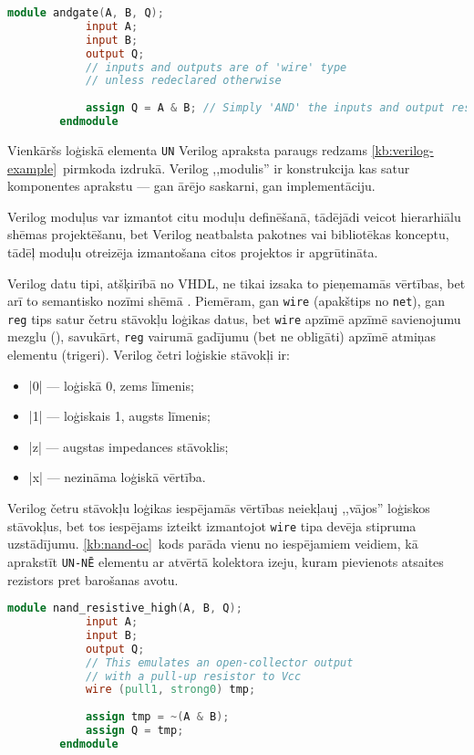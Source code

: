 	\begin{lstlisting}[language={Verilog},label=kb:verilog-example,gobble=4,%
			caption={Verilog apraksts loģiskajam \texttt{UN} elementam.}]
		module andgate(A, B, Q);
			input A;
			input B;
			output Q;
			// inputs and outputs are of 'wire' type
			// unless redeclared otherwise
			
			assign Q = A & B; // Simply 'AND' the inputs and output result
		endmodule
	\end{lstlisting}

	Vienkāršs loģiskā elementa \texttt{UN} Verilog apraksta paraugs redzams
	\ref{kb:verilog-example}~pirmkoda izdrukā.
	Verilog ,,modulis'' ir konstrukcija kas satur komponentes aprakstu
	--- gan ārējo saskarni, gan implementāciju.
	
	Verilog moduļus var izmantot citu moduļu definēšanā, tādējādi veicot
	hierarhiālu shēmas projektēšanu, bet Verilog neatbalsta pakotnes vai
	bibliotēkas konceptu, tādēļ moduļu otreizēja izmantošana citos projektos
	ir apgrūtināta.
	
	Verilog datu tipi, atšķirībā no VHDL, ne tikai izsaka
	to pieņemamās vērtības, bet arī to semantisko nozīmi shēmā
	\cite[21.~lpp.]{Vivek-Verilog}. Piemēram,
	gan \texttt{wire} (apakštips no \texttt{net}), gan \texttt{reg} tips
	satur četru stāvokļu loģikas datus, bet \texttt{wire} apzīmē
	apzīmē savienojumu mezglu (), savukārt, \texttt{reg}
	vairumā gadījumu (bet ne obligāti) apzīmē atmiņas elementu (trigeri).
	Verilog četri loģiskie stāvokļi ir:
	\begin{itemize}
		\item |0| --- loģiskā 0, zems līmenis;
		\item |1| --- loģiskais 1, augsts līmenis;
		\item |z| --- augstas impedances stāvoklis;
		\item |x| --- nezināma loģiskā vērtība.
	\end{itemize}
	
	Verilog četru stāvokļu loģikas iespējamās vērtības neiekļauj
	,,vājos'' loģiskos stāvokļus, bet tos iespējams izteikt izmantojot
	\texttt{wire} tipa devēja stipruma uzstādījumu. \ref{kb:nand-oc}~kods
	parāda vienu no iespējamiem veidiem, kā aprakstīt \texttt{UN-NĒ}
	elementu ar atvērtā kolektora izeju, kuram pievienots atsaites rezistors
	pret barošanas avotu.
	\begin{lstlisting}[language={Verilog},label=kb:nand-oc,gobble=4,%
			caption={Verilog pieraksta paraugs devēja stipruma uzstādījumam.}]
		module nand_resistive_high(A, B, Q);
			input A;
			input B;
			output Q;
			// This emulates an open-collector output
			// with a pull-up resistor to Vcc
			wire (pull1, strong0) tmp;
			
			assign tmp = ~(A & B);
			assign Q = tmp;
		endmodule
	\end{lstlisting}
	
